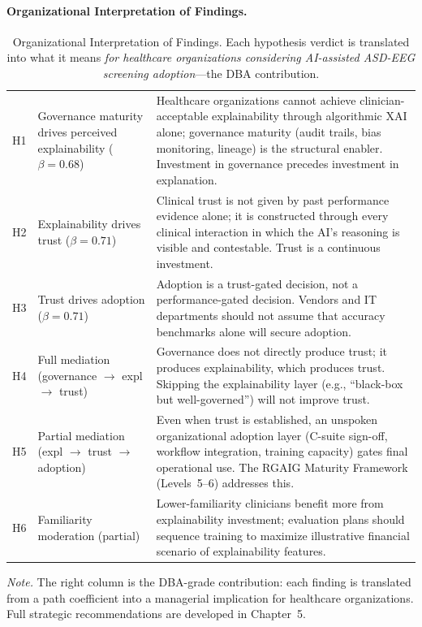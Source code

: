 \paragraph{Organizational Interpretation of Findings.}




{\tablestripes\tablefontsize
{}
\begin{xltabular}{\textwidth}{@{} >{\centering\arraybackslash}p{1.0cm} p{4.1cm} p{9.3cm} @{}}
\caption[Organizational Interpretation of Findings]{Organizational Interpretation of Findings. Each hypothesis verdict is translated into what it means \emph{for healthcare organizations considering AI-assisted ASD-EEG screening adoption}---the DBA contribution.}\label{tab:ch4_org_interpretation} \\
\toprule
{} &  &  \\
\midrule
\endfirsthead
\endhead
\bottomrule
\endlastfoot
H1 & Governance maturity drives perceived explainability ($\beta=0.68$)  & Healthcare organizations cannot achieve clinician-acceptable explainability through algorithmic XAI alone; governance maturity (audit trails, bias monitoring, lineage) is the structural enabler. Investment in governance precedes investment in explanation. \\
H2 & Explainability drives trust ($\beta=0.71$)                          & Clinical trust is not given by past performance evidence alone; it is constructed through every clinical interaction in which the AI's reasoning is visible and contestable. Trust is a continuous investment. \\
H3 & Trust drives adoption ($\beta=0.71$)                                & Adoption is a trust-gated decision, not a performance-gated decision. Vendors and IT departments should not assume that accuracy benchmarks alone will secure adoption. \\
H4 & Full mediation (governance $\to$ expl $\to$ trust)                  & Governance does not directly produce trust; it produces explainability, which produces trust. Skipping the explainability layer (e.g., ``black-box but well-governed'') will not improve trust. \\
H5 & Partial mediation (expl $\to$ trust $\to$ adoption)                 & Even when trust is established, an unspoken organizational adoption layer (C-suite sign-off, workflow integration, training capacity) gates final operational use. The RGAIG Maturity Framework (Levels~5--6) addresses this. \\
H6 & Familiarity moderation (partial)                                    & Lower-familiarity clinicians benefit more from explainability investment; evaluation plans should sequence training to maximize illustrative financial scenario of explainability features. \\
\end{xltabular}}
\vspace{0.4em}
\noindent\textit{Note.} The right column is the DBA-grade contribution: each finding is translated from a path coefficient into a managerial implication for healthcare organizations. Full strategic recommendations are developed in Chapter~5.

